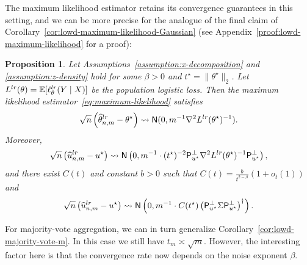 \documentclass[11pt]{article}
\newcommand{\Ep}{\mathbb{E}}
\newcommand{\prn}[1]{\left({#1}\right)} %
\newcommand{\what}[1]{\widehat{#1}}
\newcommand{\normal}{\mathsf{N}}
\newcommand{\lr}{^{\textup{lr}}}
\newcommand{\proj}{\mathsf{P}}
\newcommand{\poploss}{L}
\newcommand{\norms}[1]{\|{#1}\|} %
\newcommand{\ltwos}[1]{\norms{#1}_2} %
\newcommand{\<}{\langle} %
\renewcommand{\>}{\rangle}
\newcommand{\cd}{\rightsquigarrow}
\newcommand{\opt}{^\star}
\newtheorem{proposition}{Proposition}
\begin{document}
The maximum likelihood estimator retains its convergence
guarantees in this setting, and we can  be more precise for the
analogue of the final claim of Corollary~\ref{cor:lowd-maximum-likelihood-Gaussian} (see
Appendix~\ref{proof:lowd-maximum-likelihood} for a proof):
\begin{proposition}
  \label{prop:lowd-maximum-likelihood}
  Let Assumptions~\ref{assumption:x-decomposition} and
  \ref{assumption:z-density} hold for some $\beta  > 0$ and
  $t\opt = \ltwos{\theta\opt}$. Let $L\lr(\theta) = \Ep[
    \ell_\theta\lr(Y \mid X)]$ be the population logistic loss. Then the
  maximum likelihood estimator~\eqref{eq:maximum-likelihood} satisfies
	\begin{equation*}
		\sqrt{n} \left(\what{\theta}\lr_{n,m} - \theta\opt\right)
		\cd \normal(0, m^{-1}\nabla^2 L\lr(\theta\opt)^{-1})  . %
	\end{equation*}
	Moreover,
	\begin{equation*}
		\sqrt{n}\left(\what{u}\lr_{n,m} - u\opt\right)
		\cd \normal\left(0, m^{-1} \cdot (t\opt)^{-2} \proj_{u\opt}^\perp
		\nabla^2 \poploss\lr(\theta\opt)^{-1} \proj_{u\opt}^\perp\right), %
	\end{equation*}
	and there exist $C(t)$ and constant $b > 0$ such that
	$C(t) = \frac{b}{t^{2 - \beta}}(1 + o_t(1))$ and
	\begin{equation*}
		\sqrt{n} \left(\what{u}\lr_{n,m} - u\opt\right)
		\cd \normal\left(0, m^{-1} \cdot C(t\opt) \prn{\proj_{u\opt}^\perp \Sigma \proj_{u\opt}^\perp}^\dagger \right).  %
	\end{equation*}
\end{proposition}

For majority-vote aggregation, we can in turn generalize
Corollary~\ref{cor:lowd-majority-vote-m}. In this case we still have $t_m \asymp \sqrt{m}$. However, the interesting factor here is that
the convergence rate now depends on the noise exponent $\beta$.
\end{document}
